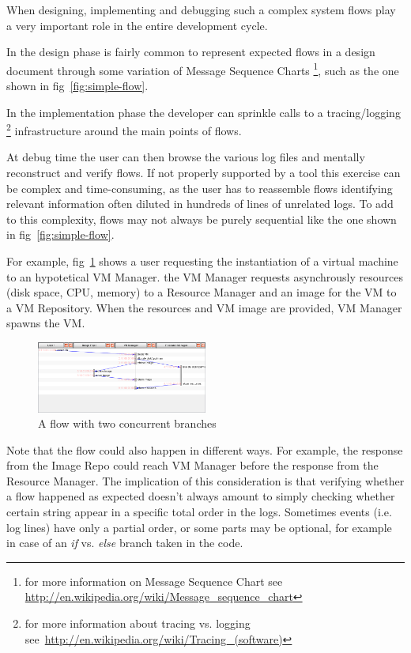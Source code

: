 \documentclass[11pt, twoside, titlepage]{book}
\begin{document}
When designing, implementing and debugging such a complex system flows play a
very important role in the entire development cycle. 

In the design phase is fairly common to represent expected flows in a design
document through some variation of Message Sequence Charts
\footnote{for more information on Message Sequence Chart see~
\href{http://en.wikipedia.org/wiki/Message\_sequence\_chart}
{http://en.wikipedia.org/wiki/Message\_sequence\_chart}}, such as the one shown
in fig~\ref{fig:simple-flow}.

In the implementation phase the developer can sprinkle calls to a
tracing/logging \footnote{ for more information about tracing vs.
logging
see~\href{http://en.wikipedia.org/wiki/Tracing\_(software)}
{http://en.wikipedia.org/wiki/Tracing\_(software)}} infrastructure
around the main points of flows.
  
At debug time
the user can then browse the various log files and mentally reconstruct and
verify flows. If not properly supported by a tool this exercise can be complex
and time-consuming, as the user has to reassemble flows identifying relevant
information often diluted in hundreds of lines of unrelated logs. To add to this
complexity, flows may not always be purely sequential like the one shown in
fig~\ref{fig:simple-flow}. 

For example, fig~\ref{fig:concurrent-flow} shows a user requesting the
instantiation of a virtual machine to an hypotetical VM Manager. the VM Manager
requests asynchrously resources (disk space, CPU, memory) to a Resource Manager
and an image for the VM to a VM Repository. When the resources and VM image are
provided, VM Manager spawns the VM.

\begin{figure}[ht!]
  \centering
  \includegraphics[width=0.5\textwidth,natwidth=1024,natheight=600]{images/concurrent-flow.png}
  \caption{A flow with two concurrent branches}
  \label{fig:concurrent-flow} 
\end{figure}  

Note that the flow could also happen in different ways. For example, 
the response from the Image Repo could reach VM Manager before the response from
the Resource Manager. The implication of this consideration is that verifying
whether a flow happened as expected doesn't always amount to simply checking
whether certain string appear in a specific total order in the logs. Sometimes
events (i.e. log lines) have only a partial order, or some parts may be
optional, for example in case of an \textit{if} vs. \textit{else} branch taken 
in the code.
\end{document}
